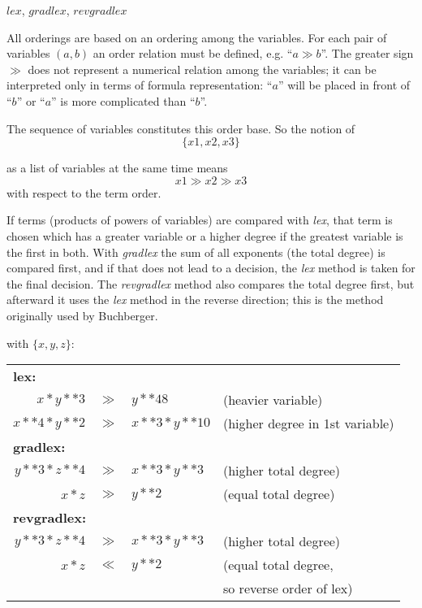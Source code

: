 \begin{center}
$lex$, $gradlex$, $revgradlex$
\end{center}

All orderings are based on an ordering among the variables. For
each pair of variables $(a,b)$ an order relation must be defined, e.g.
``$ a\gg b $''. The greater sign $\gg$  does not represent a numerical
relation among the variables; it can be interpreted only in terms of
formula representation: ``$a$'' will be placed in front of ``$b$'' or
``$a$''  is more complicated than ``$b$''.

The sequence of variables constitutes this order base. So the notion
of
\[ \{x1,x2,x3\} \]

as a list of variables at the same time means
\[ x1 \gg x2 \gg x3 \]
with respect to the term order.

If terms (products of powers of variables) are compared with \emph{lex},
that term is chosen which has a greater variable or a higher degree
if the greatest variable is the first in both. With \emph{gradlex} the sum of
all exponents (the total degree) is compared first, and if that does
not lead to a decision, the \emph{lex} method is taken for the final decision.
The \emph{revgradlex} method also compares the total degree first, but
afterward it uses the \emph{lex} method in the reverse direction; this is the
method originally used by Buchberger.

\example{} with $\{x,y,z\}$: 

\begin{center}
\begin{tabular}{@{}rlll}
  \multicolumn{2}{l}{\hspace*{-1cm}\textbf{lex:}} \\
  $x * y**3$    & $\gg$ & $y**48$ & (heavier variable) \\
  $x**4 * y**2$ & $\gg$ & $x**3 * y**10$ & (higher degree in 1st variable) \\[2mm]
  \multicolumn{2}{l}{\hspace*{-1cm}\textbf{gradlex:}} \\
  $y**3 * z**4$ & $\gg$ & $x**3 * y**3$ & (higher total degree) \\
  $x*z$         & $\gg$ & $y**2$ & (equal total degree) \\[2mm]
  \multicolumn{2}{l}{\hspace*{-1cm}\textbf{revgradlex:}} \\
  $y**3 * z**4$ & $\gg$ & $x**3 * y**3$ & (higher total degree) \\
  $x*z$         & $\ll$ & $y**2$ & (equal total degree, \\
                &       &        & so reverse order of lex)
\end{tabular}
\end{center}

